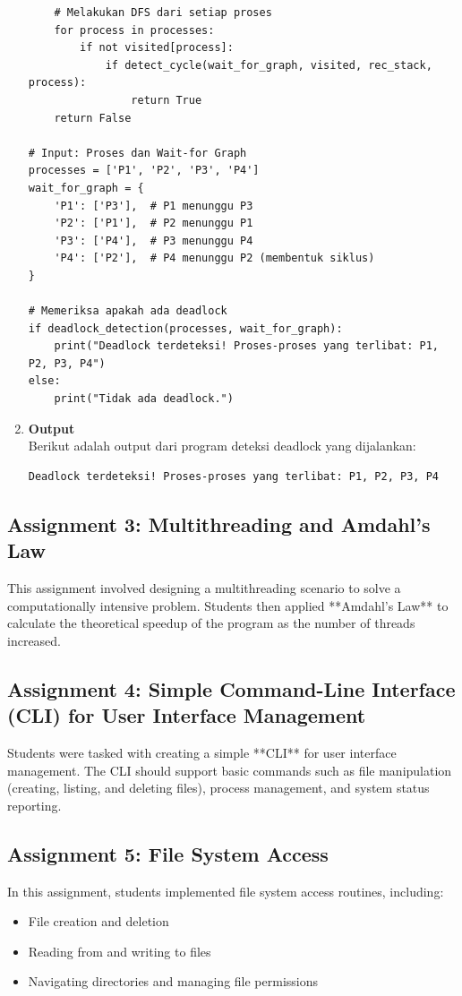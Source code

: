 \documentclass[12pt]{article}
\begin{document}
\begin{enumerate}[label=\alph*.]
\begin{lstlisting}
    # Melakukan DFS dari setiap proses
    for process in processes:
        if not visited[process]:
            if detect_cycle(wait_for_graph, visited, rec_stack, process):
                return True
    return False

# Input: Proses dan Wait-for Graph
processes = ['P1', 'P2', 'P3', 'P4']
wait_for_graph = {
    'P1': ['P3'],  # P1 menunggu P3
    'P2': ['P1'],  # P2 menunggu P1
    'P3': ['P4'],  # P3 menunggu P4
    'P4': ['P2'],  # P4 menunggu P2 (membentuk siklus)
}

# Memeriksa apakah ada deadlock
if deadlock_detection(processes, wait_for_graph):
    print("Deadlock terdeteksi! Proses-proses yang terlibat: P1, P2, P3, P4")
else:
    print("Tidak ada deadlock.")
\end{lstlisting}

\item \textbf{Output} \\
Berikut adalah output dari program deteksi deadlock yang dijalankan:
\begin{verbatim}
Deadlock terdeteksi! Proses-proses yang terlibat: P1, P2, P3, P4
\end{verbatim}
\end{enumerate}

\subsection{Assignment 3: Multithreading and Amdahl's Law}
This assignment involved designing a multithreading scenario to solve a computationally intensive problem. Students then applied **Amdahl's Law** to calculate the theoretical speedup of the program as the number of threads increased.

\subsection{Assignment 4: Simple Command-Line Interface (CLI) for User Interface Management}
Students were tasked with creating a simple **CLI** for user interface management. The CLI should support basic commands such as file manipulation (creating, listing, and deleting files), process management, and system status reporting.

\subsection{Assignment 5: File System Access}
In this assignment, students implemented file system access routines, including:
\begin{itemize}
    \item File creation and deletion
    \item Reading from and writing to files
    \item Navigating directories and managing file permissions
\end{itemize}
\end{document}
